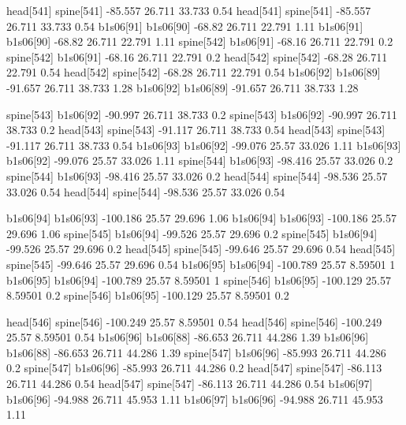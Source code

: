head[541]    spine[541]    -85.557    26.711    33.733    0.54
head[541]    spine[541]    -85.557    26.711    33.733    0.54
b1s06[91]    b1s06[90]    -68.82    26.711    22.791    1.11
b1s06[91]    b1s06[90]    -68.82    26.711    22.791    1.11
spine[542]    b1s06[91]    -68.16    26.711    22.791    0.2
spine[542]    b1s06[91]    -68.16    26.711    22.791    0.2
head[542]    spine[542]    -68.28    26.711    22.791    0.54
head[542]    spine[542]    -68.28    26.711    22.791    0.54
b1s06[92]    b1s06[89]    -91.657    26.711    38.733    1.28
b1s06[92]    b1s06[89]    -91.657    26.711    38.733    1.28


spine[543]    b1s06[92]    -90.997    26.711    38.733    0.2
spine[543]    b1s06[92]    -90.997    26.711    38.733    0.2
head[543]    spine[543]    -91.117    26.711    38.733    0.54
head[543]    spine[543]    -91.117    26.711    38.733    0.54
b1s06[93]    b1s06[92]    -99.076    25.57    33.026    1.11
b1s06[93]    b1s06[92]    -99.076    25.57    33.026    1.11
spine[544]    b1s06[93]    -98.416    25.57    33.026    0.2
spine[544]    b1s06[93]    -98.416    25.57    33.026    0.2
head[544]    spine[544]    -98.536    25.57    33.026    0.54
head[544]    spine[544]    -98.536    25.57    33.026    0.54


b1s06[94]    b1s06[93]    -100.186    25.57    29.696    1.06
b1s06[94]    b1s06[93]    -100.186    25.57    29.696    1.06
spine[545]    b1s06[94]    -99.526    25.57    29.696    0.2
spine[545]    b1s06[94]    -99.526    25.57    29.696    0.2
head[545]    spine[545]    -99.646    25.57    29.696    0.54
head[545]    spine[545]    -99.646    25.57    29.696    0.54
b1s06[95]    b1s06[94]    -100.789    25.57    8.59501    1
b1s06[95]    b1s06[94]    -100.789    25.57    8.59501    1
spine[546]    b1s06[95]    -100.129    25.57    8.59501    0.2
spine[546]    b1s06[95]    -100.129    25.57    8.59501    0.2


head[546]    spine[546]    -100.249    25.57    8.59501    0.54
head[546]    spine[546]    -100.249    25.57    8.59501    0.54
b1s06[96]    b1s06[88]    -86.653    26.711    44.286    1.39
b1s06[96]    b1s06[88]    -86.653    26.711    44.286    1.39
spine[547]    b1s06[96]    -85.993    26.711    44.286    0.2
spine[547]    b1s06[96]    -85.993    26.711    44.286    0.2
head[547]    spine[547]    -86.113    26.711    44.286    0.54
head[547]    spine[547]    -86.113    26.711    44.286    0.54
b1s06[97]    b1s06[96]    -94.988    26.711    45.953    1.11
b1s06[97]    b1s06[96]    -94.988    26.711    45.953    1.11


